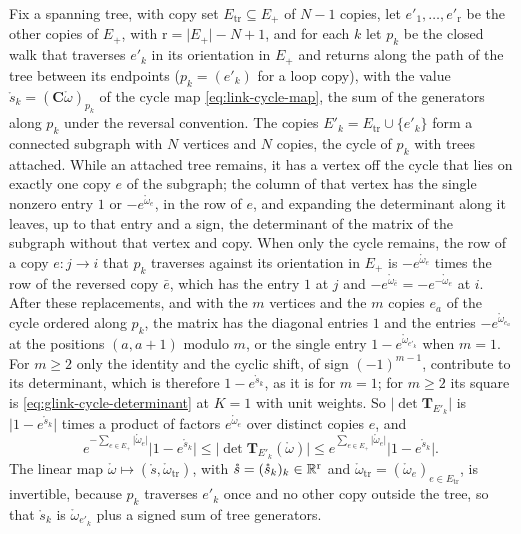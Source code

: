 Fix a spanning tree, with copy set \(E_{\mathrm{tr}}\subseteq E_+\) of \(N-1\) copies, let
\(e'_1,\ldots,e'_{\mathrm r}\) be the other copies of \(E_+\), with \(\mathrm r=\lvert E_+\rvert-N+1\), and for
each \(k\) let \(p_k\) be the closed walk that traverses \(e'_k\) in its orientation in \(E_+\) and returns
along the path of the tree between its endpoints (\(p_k=(e'_k)\) for a loop copy), with the value
\(\mathring s_k=(\mathbf C\mathring\omega)_{p_k}\) of the cycle map \eqref{eq:link-cycle-map}, the sum of the
generators along \(p_k\) under the reversal convention. The copies \(E'_k=E_{\mathrm{tr}}\cup\{e'_k\}\) form a
connected subgraph with \(N\) vertices and \(N\) copies, the cycle of \(p_k\) with trees attached. While an
attached tree remains, it has a vertex off the cycle that lies on exactly one copy \(e\) of the subgraph;
the column of that vertex has the single nonzero entry \(1\) or \(-e^{\mathring\omega_e}\), in the row of
\(e\), and expanding the determinant along it leaves, up to that entry and a sign, the determinant of the
matrix of the subgraph without that vertex and copy. When only the cycle remains, the row of a copy \(e:j\to i\) that
\(p_k\) traverses against its orientation in \(E_+\) is \(-e^{\mathring\omega_e}\) times the row of the
reversed copy \(\bar e\), which has the entry \(1\) at \(j\) and \(-e^{\mathring\omega_{\bar e}}=-e^{-\mathring\omega_e}\)
at \(i\). After these replacements, and with the \(m\) vertices and the \(m\) copies \(e_a\) of the cycle
ordered along \(p_k\), the matrix has the diagonal entries \(1\) and the entries \(-e^{\mathring\omega_{e_a}}\)
at the positions \((a,a+1)\) modulo \(m\), or the single entry \(1-e^{\mathring\omega_{e'_k}}\) when
\(m=1\). For \(m\geq2\) only the identity and the cyclic shift, of sign \((-1)^{m-1}\), contribute to its
determinant, which is therefore \(1-e^{\mathring s_k}\), as it is for \(m=1\); for \(m\geq2\) its square is
\eqref{eq:glink-cycle-determinant} at \(K=1\) with unit weights. So \(\lvert\det\mathbf T_{E'_k}\rvert\) is
\(\lvert1-e^{\mathring s_k}\rvert\) times a product of factors \(e^{\mathring\omega_e}\) over distinct copies \(e\),
and
\[
e^{-\sum_{e\in E_+}\lvert\mathring\omega_e\rvert}\lvert1-e^{\mathring s_k}\rvert
\leq\lvert\det\mathbf T_{E'_k}(\mathring\omega)\rvert
\leq e^{\sum_{e\in E_+}\lvert\mathring\omega_e\rvert}\lvert1-e^{\mathring s_k}\rvert.
\]
The linear map \(\mathring\omega\mapsto(\mathring s,\mathring\omega_{\mathrm{tr}})\), with
\(\mathring s=(\mathring s_k)_k\in\mathbb R^{\mathrm r}\) and \(\mathring\omega_{\mathrm{tr}}=(\mathring\omega_e)_{e\in E_{\mathrm{tr}}}\), is
invertible, because \(p_k\) traverses \(e'_k\) once and no other copy outside the tree, so that
\(\mathring s_k\) is \(\mathring\omega_{e'_k}\) plus a signed sum of tree generators.


